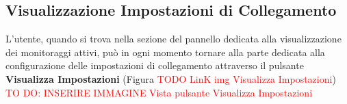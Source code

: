 \subsection{Visualizzazione Impostazioni di Collegamento}\label{ImpostazioniCollegamento}

L'utente, quando si trova nella sezione del pannello dedicata alla visualizzazione dei monitoraggi attivi, può in ogni momento tornare alla parte dedicata alla configurazione delle impostazioni di collegamento attraverso il pulsante \textbf{Visualizza Impostazioni} (Figura \textcolor{red}{TODO LinK img Visualizza Impostazioni})\\

\textcolor{red}{TO DO: INSERIRE IMMAGINE Vista pulsante Visualizza Impostazioni}

